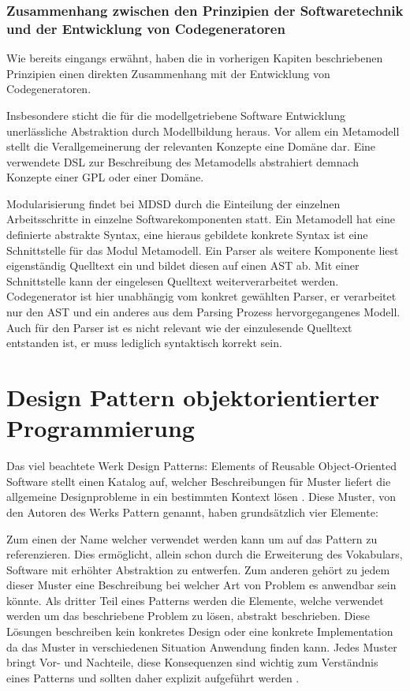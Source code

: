 \documentclass[12pt,oneside,a4paper,parskip]{scrbook}
\begin{document}
\subsubsection{Zusammenhang zwischen den Prinzipien der Softwaretechnik und der Entwicklung von Codegeneratoren}

Wie bereits eingangs erwähnt, haben die in vorherigen Kapiten beschriebenen Prinzipien einen direkten Zusammenhang mit der Entwicklung von Codegeneratoren.

Insbesondere sticht die für die modellgetriebene Software Entwicklung unerlässliche Abstraktion durch Modellbildung heraus. Vor allem ein Metamodell stellt die Verallgemeinerung der relevanten Konzepte eine Domäne dar. Eine verwendete DSL zur Beschreibung des Metamodells abstrahiert demnach Konzepte einer GPL oder einer Domäne.

Modularisierung findet bei MDSD durch die Einteilung der einzelnen Arbeitsschritte in einzelne Softwarekomponenten statt. Ein Metamodell hat eine definierte abstrakte Syntax, eine hieraus gebildete konkrete Syntax ist eine Schnittstelle für das Modul Metamodell. Ein Parser als weitere Komponente liest eigenständig Quelltext ein und bildet diesen auf einen AST ab. Mit einer Schnittstelle kann der eingelesen Quelltext weiterverarbeitet werden. Codegenerator ist hier unabhängig vom konkret gewählten Parser, er verarbeitet nur den AST und ein anderes aus dem Parsing Prozess hervorgegangenes Modell. Auch für den Parser ist es nicht relevant wie der einzulesende Quelltext entstanden ist, er muss lediglich syntaktisch korrekt sein.

\section{Design Pattern objektorientierter Programmierung}

Das viel beachtete Werk Design Patterns: Elements of Reusable Object-Oriented Software stellt einen Katalog auf, welcher Beschreibungen für Muster liefert die allgemeine Designprobleme in ein bestimmten Kontext lösen \cite{gamma1995}. Diese Muster, von den Autoren des Werks Pattern genannt, haben grundsätzlich vier Elemente: 

Zum einen der Name welcher verwendet werden kann um auf das Pattern zu referenzieren. Dies ermöglicht, allein schon durch die Erweiterung des Vokabulars, Software mit erhöhter Abstraktion zu entwerfen. Zum anderen gehört zu jedem dieser Muster eine Beschreibung bei welcher Art von Problem es anwendbar sein könnte. Als dritter Teil eines Patterns werden die Elemente, welche verwendet werden um das beschriebene Problem zu lösen, abstrakt beschrieben. Diese Lösungen beschreiben kein konkretes Design oder eine konkrete Implementation da das Muster in verschiedenen Situation Anwendung finden kann. Jedes Muster bringt Vor- und Nachteile, diese Konsequenzen sind wichtig zum Verständnis eines Patterns und sollten daher explizit aufgeführt werden \cite[S.30 f.]{gamma2015}.
\end{document}
